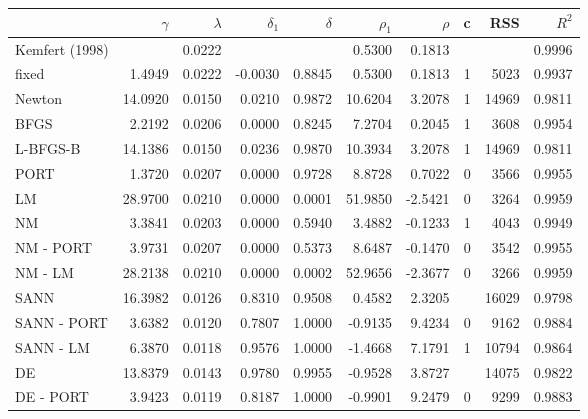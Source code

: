 \begin{tabular}{lrrrrrrrrr}
  \hline
 & $\gamma$ & $\lambda$ & $\delta_1$ & $\delta$ & $\rho_1$ & $\rho$ & c & RSS & $R^2$ \\ 
  \hline
Kemfert (1998) &  & 0.0222 &  &  & 0.5300 & 0.1813 &  &  & 0.9996 \\ 
  \color{red} fixed & \color{red} 1.4949 & \color{red} 0.0222 & \color{red} -0.0030 & \color{red} 0.8845 & \color{red} 0.5300 & \color{red} 0.1813 & \color{red} 1 & \color{red} 5023 & \color{red} 0.9937 \\ 
  Newton & 14.0920 & 0.0150 & 0.0210 & 0.9872 & 10.6204 & 3.2078 & 1 & 14969 & 0.9811 \\ 
  BFGS & 2.2192 & 0.0206 & 0.0000 & 0.8245 & 7.2704 & 0.2045 & 1 & 3608 & 0.9954 \\ 
  L-BFGS-B & 14.1386 & 0.0150 & 0.0236 & 0.9870 & 10.3934 & 3.2078 & 1 & 14969 & 0.9811 \\ 
  PORT & 1.3720 & 0.0207 & 0.0000 & 0.9728 & 8.8728 & 0.7022 & 0 & 3566 & 0.9955 \\ 
  \color{red} LM & \color{red} 28.9700 & \color{red} 0.0210 & \color{red} 0.0000 & \color{red} 0.0001 & \color{red} 51.9850 & \color{red} -2.5421 & \color{red} 0 & \color{red} 3264 & \color{red} 0.9959 \\ 
  NM & 3.3841 & 0.0203 & 0.0000 & 0.5940 & 3.4882 & -0.1233 & 1 & 4043 & 0.9949 \\ 
  NM - PORT & 3.9731 & 0.0207 & 0.0000 & 0.5373 & 8.6487 & -0.1470 & 0 & 3542 & 0.9955 \\ 
  \color{red} NM - LM & \color{red} 28.2138 & \color{red} 0.0210 & \color{red} 0.0000 & \color{red} 0.0002 & \color{red} 52.9656 & \color{red} -2.3677 & \color{red} 0 & \color{red} 3266 & \color{red} 0.9959 \\ 
  SANN & 16.3982 & 0.0126 & 0.8310 & 0.9508 & 0.4582 & 2.3205 &  & 16029 & 0.9798 \\ 
  SANN - PORT & 3.6382 & 0.0120 & 0.7807 & 1.0000 & -0.9135 & 9.4234 & 0 & 9162 & 0.9884 \\ 
  \color{red} SANN - LM & \color{red} 6.3870 & \color{red} 0.0118 & \color{red} 0.9576 & \color{red} 1.0000 & \color{red} -1.4668 & \color{red} 7.1791 & \color{red} 1 & \color{red} 10794 & \color{red} 0.9864 \\ 
  DE & 13.8379 & 0.0143 & 0.9780 & 0.9955 & -0.9528 & 3.8727 &  & 14075 & 0.9822 \\ 
  DE - PORT & 3.9423 & 0.0119 & 0.8187 & 1.0000 & -0.9901 & 9.2479 & 0 & 9299 & 0.9883 \\ 

\end{tabular}

